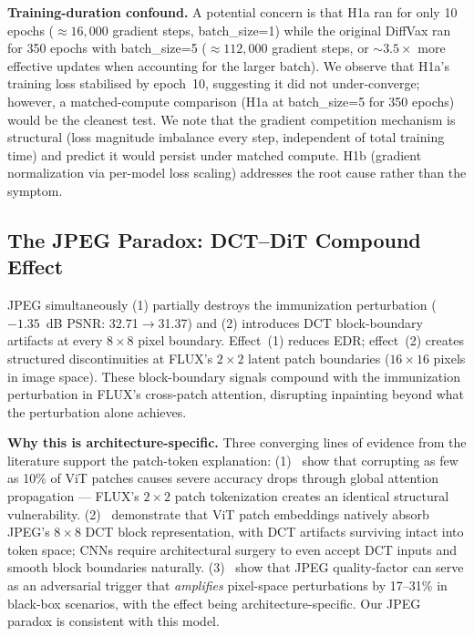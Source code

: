 \documentclass{article}
\begin{document}
\textbf{Training-duration confound.} A potential concern is that H1a ran for only
10 epochs (${\approx}16{,}000$ gradient steps, batch\_size=1) while the original DiffVax
ran for 350 epochs with batch\_size=5 (${\approx}112{,}000$ gradient steps, or ${\sim}3.5\times$ more
effective updates when accounting for the larger batch). We observe that H1a's training
loss stabilised by epoch~10, suggesting it did not under-converge; however, a matched-compute
comparison (H1a at batch\_size=5 for 350 epochs) would be the cleanest test.
We note that the gradient competition mechanism is structural (loss magnitude imbalance every step,
independent of total training time) and predict it would persist under matched compute.
H1b (gradient normalization via per-model loss scaling) addresses the root cause rather than the symptom.

\subsection{The JPEG Paradox: DCT--DiT Compound Effect}
\label{sec:jpeg_paradox_analysis}

JPEG simultaneously (1) partially destroys the immunization perturbation ($-1.35$~dB
PSNR: 32.71$\to$31.37) and (2) introduces DCT block-boundary artifacts at every
$8\!\times\!8$ pixel boundary. Effect~(1) reduces EDR; effect~(2) creates structured
discontinuities at FLUX's $2\!\times\!2$ latent patch boundaries ($16\!\times\!16$ pixels
in image space). These block-boundary signals compound with the immunization perturbation
in FLUX's cross-patch attention, disrupting inpainting beyond what the perturbation alone achieves.

\textbf{Why this is architecture-specific.} Three converging lines of evidence from
the literature support the patch-token explanation:
(1)~\citet{guo2023rspc} show that corrupting as few as 10\% of ViT patches causes
severe accuracy drops through global attention propagation --- FLUX's $2\times2$
patch tokenization creates an identical structural vulnerability.
(2)~\citet{li2022jpegvit} demonstrate that ViT patch embeddings natively absorb JPEG's
$8\times8$ DCT block representation, with DCT artifacts surviving intact into token space;
CNNs require architectural surgery to even accept DCT inputs and smooth block boundaries naturally.
(3)~\citet{chen2024transformadv} show that JPEG quality-factor can serve as an adversarial
trigger that \emph{amplifies} pixel-space perturbations by 17--31\% in black-box scenarios,
with the effect being architecture-specific. Our JPEG paradox is consistent with this model.
\end{document}

